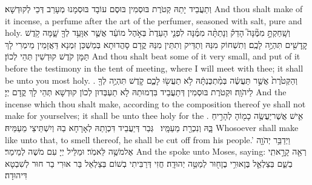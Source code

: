{וְתַעֲבֵיד יָתַהּ קְטֹרֶת בּוּסְמִין בּוּסֶם עוֹבָד בּוּסְמָנוּ מְעָרַב דְּכֵי לְקוּדְשָׁא׃}
{And thou shalt make of it incense, a perfume after the art of the perfumer, seasoned with salt, pure and holy.}{}
{וְשָֽׁחַקְתָּ֣ מִמֶּ֘נָּה֮ הָדֵק֒ וְנָתַתָּ֨ה מִמֶּ֜נָּה לִפְנֵ֤י הָעֵדֻת֙ בְּאֹ֣הֶל מוֹעֵ֔ד אֲשֶׁ֛ר אִוָּעֵ֥ד לְךָ֖ שָׁ֑מָּה קֹ֥דֶשׁ קׇֽדָשִׁ֖ים תִּהְיֶ֥ה לָכֶֽם׃}
{וְתִשְׁחוֹק מִנַּהּ וְתַדֵּיק וְתִתֵּין מִנַּהּ קֳדָם סָהֲדוּתָא בְּמַשְׁכַּן זִמְנָא דַּאֲזָמֵין מֵימְרִי לָךְ תַּמָּן קֹדֶשׁ קוּדְשִׁין תְּהֵי לְכוֹן׃}
{And thou shalt beat some of it very small, and put of it before the testimony in the tent of meeting, where I will meet with thee; it shall be unto you most holy. .}{}
{וְהַקְּטֹ֙רֶת֙ אֲשֶׁ֣ר תַּעֲשֶׂ֔ה בְּמַ֨תְכֻּנְתָּ֔הּ לֹ֥א תַעֲשׂ֖וּ לָכֶ֑ם קֹ֛דֶשׁ תִּהְיֶ֥ה לְךָ֖ לַיהֹוָֽה׃}
{וּקְטֹרֶת בּוּסְמִין דְּתַעֲבֵיד בִּדְמוּתַהּ לָא תַעְבְּדוּן לְכוֹן קוּדְשָׁא תְּהֵי לָךְ קֳדָם יְיָ׃}
{And the incense which thou shalt make, according to the composition thereof ye shall not make for yourselves; it shall be unto thee holy for the \lord.}{}
{אִ֛ישׁ אֲשֶׁר\maqqaf יַעֲשֶׂ֥ה כָמ֖וֹהָ לְהָרִ֣יחַ בָּ֑הּ וְנִכְרַ֖ת מֵעַמָּֽיו׃ \setuma }
{גְּבַר דְּיַעֲבֵיד דִּכְוָתַהּ לְאָרָחָא בַהּ וְיִשְׁתֵּיצֵי מֵעַמֵּיהּ׃}
{Whosoever shall make like unto that, to smell thereof, he shall be cut off from his people.’}{}
\newperek
{}
{וַיְדַבֵּ֥ר יְהֹוָ֖ה אֶל\maqqaf מֹשֶׁ֥ה לֵּאמֹֽר׃}
{וּמַלֵּיל יְיָ עִם מֹשֶׁה לְמֵימַר׃}
{And the \lord\space spoke unto Moses, saying:}{}
{רְאֵ֖ה קָרָ֣אתִֽי בְשֵׁ֑ם בְּצַלְאֵ֛ל בֶּן\maqqaf אוּרִ֥י בֶן\maqqaf ח֖וּר לְמַטֵּ֥ה יְהוּדָֽה׃}
{חֲזִי דְּרַבִּיתִי בְשׁוֹם בְּצַלְאֵל בַּר אוּרִי בַר חוּר לְשִׁבְטָא דִּיהוּדָה׃}

